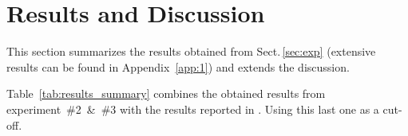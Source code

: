 \section{Results and Discussion}\label{sec:res} \label{sec:dis}

This section summarizes the results obtained from Sect.\,\ref{sec:exp} (extensive results can be found in Appendix~\ref{app:1}) and extends the discussion.

Table~\ref{tab:results_summary} combines the obtained results from experiment~\#2~\&~\#3 with the results reported in .
Using this last one as a cut-off.


